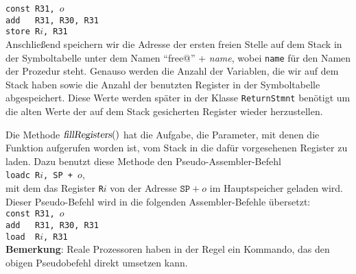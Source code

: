 \noindent
\hspace*{1.3cm} \texttt{const R31, $o$} \\
\hspace*{1.3cm} \texttt{add \ \ R31, R30, R31} \\
\hspace*{1.3cm} \texttt{store R$i$, R31} 
\\[0.2cm]
Anschlie{\ss}end speichern wir die Adresse der ersten freien Stelle auf dem Stack in der
Symboltabelle unter dem Namen ``free@'' + \textsl{name}, wobei \texttt{name}
f\"ur den Namen der Prozedur steht.
Genauso werden die Anzahl der Variablen, die wir auf dem Stack haben sowie die Anzahl der
benutzten Register in der Symboltabelle abgespeichert.  Diese Werte werden sp\"ater in der
Klasse \texttt{ReturnStmnt} ben\"otigt um die alten Werte der auf dem Stack gesicherten
Register wieder herzustellen.


Die Methode $\textsl{fillRegisters}()$ hat die Aufgabe, die Parameter, mit denen die
Funktion aufgerufen worden ist, vom Stack in die daf\"ur vorgesehenen Register zu laden.
Dazu benutzt diese Methode den Pseudo-Assembler-Befehl
\\[0.2cm]
\hspace*{1.3cm}
\texttt{loadc R$i$, SP + $o$},
\\[0.2cm]
mit dem das Register \texttt{R$i$} von der Adresse  $\texttt{SP} + o$ im Hauptspeicher
geladen wird.  Dieser Pseudo-Befehl wird in die folgenden Assembler-Befehle \"ubersetzt:
\\[0.2cm]
\noindent
\hspace*{1.3cm} \texttt{const R31, $o$} \\
\hspace*{1.3cm} \texttt{add \ \ R31, R30, R31} \\
\hspace*{1.3cm} \texttt{load \ R$i$, R31} 
\\[0.2cm]
\textbf{Bemerkung}: Reale Prozessoren haben in der Regel ein Kommando, das den obigen
Pseudobefehl direkt umsetzen kann.

